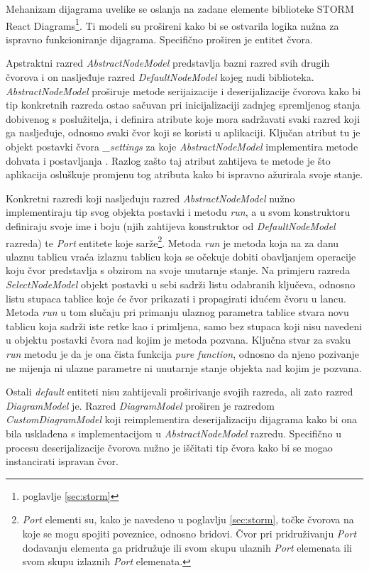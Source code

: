 \documentclass[times, utf8, diplomski, numeric]{fer}
\begin{document}
Mehanizam dijagrama uvelike se oslanja na zadane  elemente biblioteke STORM React Diagrams\footnote{poglavlje \ref{sec:storm}}.
Ti modeli su prošireni kako bi se ostvarila logika nužna za ispravno funkcioniranje dijagrama.
Specifično proširen je entitet čvora.

Apstraktni razred \emph{AbstractNodeModel} predstavlja bazni razred svih drugih čvorova i on nasljeđuje razred \emph{DefaultNodeModel} kojeg nudi biblioteka.
\emph{AbstractNodeModel} proširuje metode serijaizacije i deserijalizacije čvorova kako bi tip konkretnih razreda ostao sačuvan pri inicijalizaciji zadnjeg spremljenog stanja dobivenog s poslužitelja, i definira atribute koje mora sadržavati svaki razred koji ga nasljeđuje, odnosno svaki čvor koji se koristi u aplikaciji.
Ključan atribut tu je objekt postavki čvora \emph{\_settings} za koje \emph{AbstractNodeModel} implementira metode dohvata  i postavljanja .
Razlog zašto taj atribut zahtijeva te metode je što aplikacija osluškuje promjenu tog atributa kako bi ispravno ažurirala svoje stanje.

Konkretni razredi koji nasljeđuju razred \emph{AbstractNodeModel} nužno implementiraju tip svog objekta postavki i metodu \emph{run}, a u svom konstruktoru definiraju svoje ime i boju (njih zahtijeva konstruktor od \emph{DefaultNodeModel} razreda) te \emph{Port} entitete koje sarže\footnote{
    \emph{Port} elementi su, kako je navedeno u poglavlju \ref{sec:storm}, točke čvorova na koje se mogu spojiti poveznice, odnosno bridovi.
    Čvor pri pridruživanju \emph{Port} dodavanju elementa ga pridružuje ili svom skupu ulaznih \emph{Port} elemenata ili svom skupu izlaznih \emph{Port} elemenata.
}.
Metoda \emph{run} je metoda koja na za danu ulaznu tablicu vraća izlaznu tablicu koja se očekuje dobiti obavljanjem operacije koju čvor predstavlja s obzirom na svoje unutarnje stanje.
Na primjeru razreda \emph{SelectNodeModel} objekt postavki u sebi sadrži listu odabranih ključeva, odnosno listu stupaca tablice koje će čvor prikazati i propagirati idućem čvoru u lancu.
Metoda \emph{run} u tom slučaju pri primanju ulaznog parametra tablice stvara novu tablicu koja sadrži iste retke kao i primljena, samo bez stupaca koji nisu navedeni u objektu postavki čvora nad kojim je metoda pozvana. 
Ključna stvar za svaku \emph{run} metodu je da je ona čista funkcija \emph{pure function}, odnosno da njeno pozivanje ne mijenja ni ulazne parametre ni unutarnje stanje objekta nad kojim je pozvana.

Ostali \emph{default} entiteti nisu zahtijevali proširivanje svojih razreda, ali zato razred \emph{DiagramModel} je.
Razred \emph{DiagramModel} proširen je razredom \emph{CustomDiagramModel} koji reimplementira deserijalizaciju dijagrama kako bi ona bila usklađena s implementacijom u \emph{AbstractNodeModel} razredu.
Specifično u procesu deserijalizacije čvorova nužno je iščitati tip čvora kako bi se mogao instancirati ispravan čvor.
\end{document}

